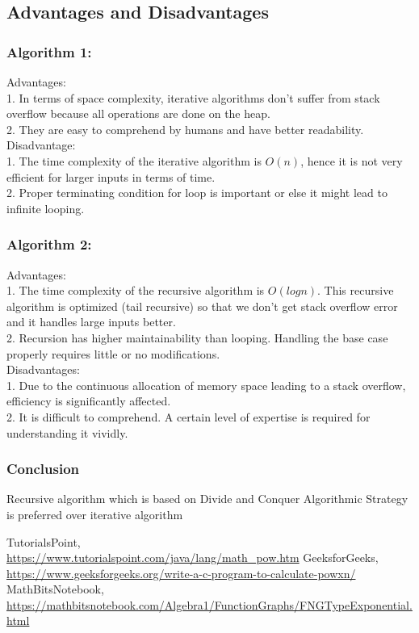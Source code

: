 \documentclass{article}
\begin{document}
\subsection*{Advantages and Disadvantages}
\subsubsection*{Algorithm 1:}
Advantages:\\
1. In terms of space complexity, iterative algorithms don't suffer from stack overflow because all operations are done on the heap. \\
2. They are easy to comprehend by humans and have better readability.\\
Disadvantage:\\
1. The time complexity of the iterative algorithm is $O (n)$, hence it is not very efficient for larger inputs in terms of time.  \\
2. Proper terminating condition for loop is important or else it might lead to infinite looping.
\subsubsection*{Algorithm 2:}
Advantages: \\
1. The time complexity of the recursive algorithm is $O (log n)$. This recursive algorithm is optimized (tail recursive) so that we don't get stack overflow error and it handles large inputs better. \\
2. Recursion has higher maintainability than looping. Handling the base case properly requires little or no modifications.\\
Disadvantages:\\
1. Due to the continuous allocation of memory space leading to a stack overflow, efficiency is significantly affected. \\
2. It is difficult to comprehend. A certain level of expertise is required for understanding it vividly.
\subsubsection*{Conclusion}
Recursive algorithm which is based on Divide and Conquer Algorithmic Strategy is preferred over iterative algorithm  

\begin{thebibliography}{9}
TutorialsPoint,\\
\url{https://www.tutorialspoint.com/java/lang/math_pow.htm}
GeeksforGeeks,\\
\url{https://www.geeksforgeeks.org/write-a-c-program-to-calculate-powxn/}
MathBitsNotebook,\\
\url{https://mathbitsnotebook.com/Algebra1/FunctionGraphs/FNGTypeExponential.html}
\end{thebibliography}
\end{document}
